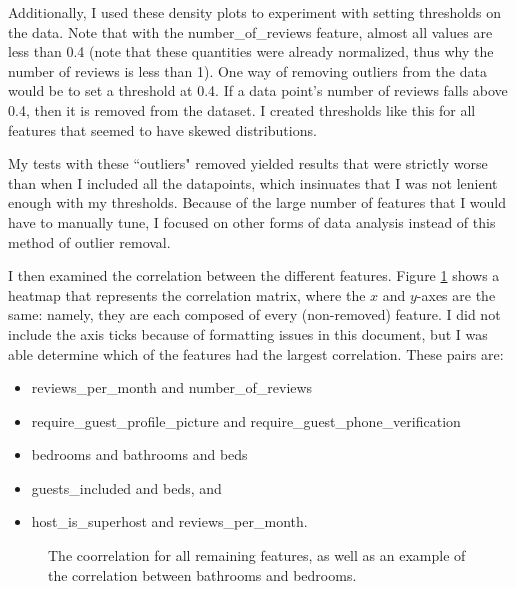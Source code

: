 \documentclass{ws-ijprai}
\begin{document}
Additionally, I used these density plots to experiment with setting thresholds on the data. Note that with the number\_of\_reviews feature, almost all values are less than 0.4 (note that these quantities were already normalized, thus why the number of reviews is less than 1). One way of removing outliers from the data would be to set a threshold at 0.4. If a data point's number of reviews falls above 0.4, then it is removed from the dataset. I created thresholds like this for all features that seemed to have skewed distributions.

My tests with these ``outliers" removed yielded results that were strictly worse than when I included all the datapoints, which insinuates that I was not lenient enough with my thresholds. Because of the large number of features that I would have to manually tune, I focused on other forms of data analysis instead of this method of outlier removal.

I then examined the correlation between the different features. Figure \ref{fig:corr} shows a heatmap that represents the correlation matrix, where the $x$ and $y$-axes are the same: namely, they are each composed of every (non-removed) feature. I did not include the axis ticks because of formatting issues in this document, but I was able determine which of the features had the largest correlation. These pairs are:
\begin{itemize}
	\item reviews\_per\_month and number\_of\_reviews
	\item require\_guest\_profile\_picture and require\_guest\_phone\_verification
	\item bedrooms and bathrooms and beds
	\item guests\_included and beds, and
	\item host\_is\_superhost and reviews\_per\_month.
\end{itemize}

\begin{figure}[H]
	\centering
	\caption{The coorrelation for all remaining features, as well as an example of the correlation between bathrooms and bedrooms.}
	\label{fig:corr}
\end{figure}
\end{document}
